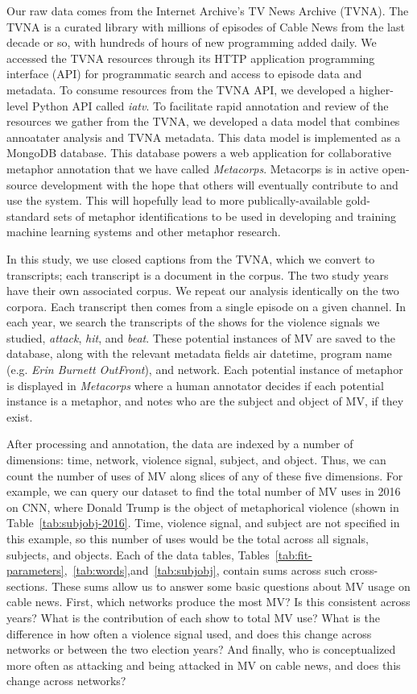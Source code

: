 Our raw data comes from the Internet Archive's TV News Archive (TVNA).
The TVNA is a curated library with millions of episodes of Cable News 
from the last decade or so, with 
hundreds of hours of new programming added daily. We accessed the TVNA 
resources through its HTTP
application programming interface (API) for programmatic search and access to 
episode data and metadata. 
To consume resources from the TVNA API, we developed a higher-level Python API called
\emph{iatv}. To facilitate rapid annotation and review of the resources
we gather from the TVNA, we developed a data model that combines
annoatater analysis and TVNA metadata. This data model is implemented as
a MongoDB database. This database powers a web application for
collaborative metaphor annotation that we have called \emph{Metacorps}. 
Metacorps is in active open-source development with the hope that others will eventually
contribute to and use the system. This will hopefully lead to
more publically-available gold-standard sets of
metaphor identifications to be used in developing and training
machine learning systems and other metaphor research. 

In this study, we use closed captions from the TVNA, which we convert to
transcripts; each transcript is a document in the corpus. 
The two study years have their own associated corpus. We repeat our analysis
identically on the two corpora. 
Each transcript then comes from a single episode on a given channel.  
In each year, we search the transcripts of the shows for the violence signals 
we studied, \emph{attack}, \emph{hit}, and \emph{beat}. These potential
instances of MV are saved to the database, along with the relevant metadata
fields air datetime, program name (e.g. \emph{Erin Burnett OutFront}),
and network. Each potential instance of metaphor is displayed in 
\emph{Metacorps} where a human annotator decides if each potential instance
is a metaphor, and notes who are the subject and object of MV, if they 
exist. 

After processing and annotation, the data are indexed by a number of dimensions: 
time, network, violence signal, subject, and object.
Thus, we can count the number of uses of MV along slices of any of these
five dimensions. For example, we can query our dataset to find the total
number of MV uses in 2016 on CNN, where Donald Trump is the object of
metaphorical violence (shown in Table~\ref{tab:subjobj-2016}. 
Time, violence signal, and subject are not specified in this example, 
so this number of uses would be the total across all
signals, subjects, and objects. Each of the data tables, 
Tables~\ref{tab:fit-parameters},~\ref{tab:words},and~\ref{tab:subjobj}, 
contain sums across such cross-sections. These sums allow us to answer some 
basic questions about MV usage on cable news.
First, which networks produce the most MV? Is this consistent across years?
What is the contribution of each show to total MV use? 
What is the difference in how often a violence signal used, 
and does this change across networks or between the two election years?
And finally, who is conceptualized more often as attacking and being attacked in MV on
cable news, and does this change across networks? 

